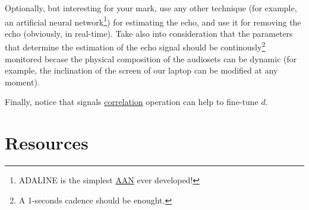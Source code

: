 Optionally, but interesting for your mark, use any other technique
(for example, an artificial neural network\footnote{ADALINE is the
  simplest
  \href{https://en.wikipedia.org/wiki/Neural_network_(machine_learning)}{AAN}
  ever developed!}) for estimating the echo, and use it for removing
the echo (obviously, in real-time). Take also into consideration that
the parameters that determine the estimation of the echo signal should
be continously\footnote{A 1-seconds cadence should be enought.}
monitored becase the physical composition of the audiosets can
be dynamic (for example, the inclination of the screen of our laptop
can be modified at any moment).

Finally, notice that signals
\href{https://en.wikipedia.org/wiki/Correlation}{correlation}
operation can help to fine-tune $d$.

\section{Resources}




